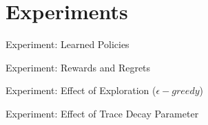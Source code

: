 \section{Experiments}

\begin{frame}{Experiment: Learned Policies}
\end{frame}

\begin{frame}{Experiment: Rewards and Regrets}
\end{frame}

\begin{frame}{Experiment: Effect of Exploration ($\epsilon-greedy$)}
\end{frame}

\begin{frame}{Experiment: Effect of Trace Decay Parameter}
\end{frame}
